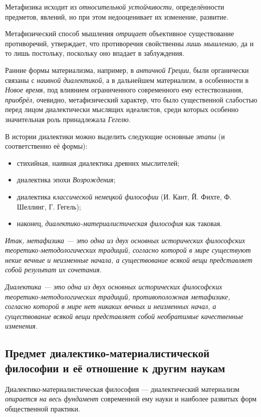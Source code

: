 \documentclass[a4paper,14pt,russian]{extreport}
\begin{document}
Метафизика исходит из \emph{относительной устойчивости}, определённости предметов, явлений, но при этом недооценивает их изменение, развитие.

Метафизический способ мышления \emph{отрицает} объективное существование противоречий, утверждает, что противоречия свойственны \emph{лишь мышлению}, да и то лишь постольку, поскольку оно впадает в заблуждения.

Ранние формы материализма, например, в \emph{античной Греции}, были органически связаны с \emph{наивной диалектикой}, а в дальнейшем материализм, в особенности в \emph{Новое время}, под влиянием ограниченного современного ему естествознания, \emph{приобрёл}, очевидно, метафизический характер, что было существенной слабостью перед лицом диалектически мыслящих идеалистов, среди которых особенно значительная роль принадлежала \emph{Гегелю}.

В истории диалектики можно выделить следующие основные \emph{этапы} (и соответственно её формы):

\begin{itemize}
\item стихийная, наивная диалектика древних мыслителей;
\item диалектика эпохи \emph{Возрождения};
\item диалектика \emph{классической немецкой философии} (И. Кант, Й. Фихте, Ф. Шеллинг, Г. Гегель);
\item наконец, \emph{диалектико-материалистическая философия} как таковая.
\end{itemize}

\emph{Итак, метафизика --- это одна из двух основных исторических философских теоретико-методологических традиций, согласно которой в мире существуют некие вечные и неизменные начала, а существование всякой вещи представляет собой результат их сочетания.}

\emph{Диалектика --- это одна из двух основных исторических философских теоретико-методологических традиций, противоположная метафизике, согласно которой в мире нет никаких вечных и неизменных начал, а существование всякой вещи представляет собой необратимые качественные изменения.}

\subsection{Предмет диалектико-материалистической философии и её отношение к другим наукам}

Диалектико-материалистическая философия --- диалектический материализм \emph{опирается на весь фундамент} современной ему науки и наиболее развитых форм общественной практики.
\end{document}
